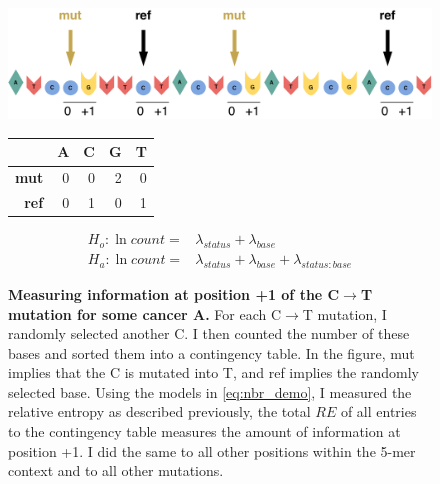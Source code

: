 \begin{figure}[h!]
  \begin{minipage}[c]{\textwidth}
    \includegraphics[width=\textwidth]{graphics/flank_demo.pdf}
  \end{minipage}\hfill
  \vspace{1cm}
  
  \begin{minipage}[c]{0.48\textwidth}
  \centering
    \begin{tabulary}{\columnwidth}{rRRRR}
    \toprule
        & \textbf{A} & \textbf{C} & \textbf{G} & \textbf{T}  \\
    \hline
        \textbf{mut} & 0 & 0 & 2 & 0  \\
        \textbf{ref} & 0 & 1 & 0 & 1  \\
    \bottomrule
    \end{tabulary}
  \end{minipage}\hfill
  \begin{minipage}[c]{0.48\textwidth}
    \begin{equation}
        \begin{aligned}
            H_o: \ln{count} =& \lambda_{status} + \lambda_{base} \\
            H_a: \ln{count} =& \lambda_{status} + \lambda_{base} + \lambda_{status:base}
        \end{aligned}
        \label{eq:nbr_demo}
    \end{equation}
  \end{minipage}
  \vspace{0.5cm}
  
  \begin{minipage}[c]{\textwidth}
    \caption{
      \textbf{Measuring information at position +1 of the C$\rightarrow$T mutation for some cancer A.} For each C$\rightarrow$T mutation, I randomly selected another C. I then counted the number of these bases and sorted them into a contingency table. In the figure, mut implies that the C is mutated into T, and ref implies the randomly selected base. Using the models in \ref{eq:nbr_demo}, I measured the relative entropy as described previously, the total $RE$ of all entries to the contingency table measures the amount of information at position +1. I did the same to all other positions within the 5-mer context and to all other mutations.
    } \label{fig:nbr_demo}
  \end{minipage}
\end{figure}
